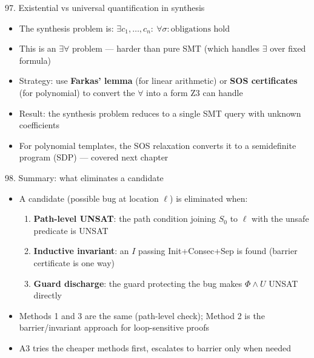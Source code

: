 \documentclass[aspectratio=169]{beamer}
\begin{document}
\begin{frame}{97. Existential vs universal quantification in synthesis}
\begin{itemize}
  \item The synthesis problem is: \(\exists c_1, \ldots, c_n:\ \forall \sigma: \text{obligations hold}\)
  \item This is an \(\exists\forall\) problem --- harder than pure SMT (which handles \(\exists\) over fixed formula)
  \item Strategy: use \textbf{Farkas' lemma} (for linear arithmetic) or \textbf{SOS certificates} (for polynomial) to convert the \(\forall\) into a form Z3 can handle
  \item Result: the synthesis problem reduces to a single SMT query with unknown coefficients
  \item For polynomial templates, the SOS relaxation converts it to a semidefinite program (SDP) --- covered next chapter
\end{itemize}
\end{frame}

\begin{frame}{98. Summary: what eliminates a candidate}
\begin{itemize}
  \item A candidate (possible bug at location \(\ell\)) is eliminated when:
  \begin{enumerate}
    \item \textbf{Path-level UNSAT}: the path condition joining \(S_0\) to \(\ell\) with the unsafe predicate is UNSAT
    \item \textbf{Inductive invariant}: an \(I\) passing Init+Consec+Sep is found (barrier certificate is one way)
    \item \textbf{Guard discharge}: the guard protecting the bug makes \(\Phi \wedge U\) UNSAT directly
  \end{enumerate}
  \item Methods 1 and 3 are the same (path-level check); Method 2 is the barrier/invariant approach for loop-sensitive proofs
  \item A3 tries the cheaper methods first, escalates to barrier only when needed
\end{itemize}
\end{frame}
\end{document}
